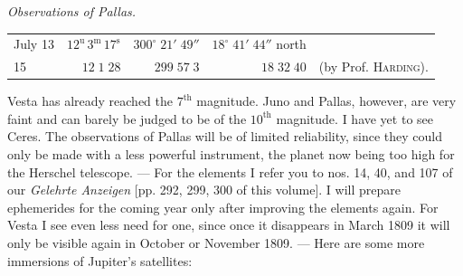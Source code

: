 \begin{center}\emph{Observations of Pallas.}\end{center}

\begin{center}\fontsize{9}{12}\selectfont\setlength{\tabcolsep}{3pt}\renewcommand{\arraystretch}{1.15}\begin{tabular}{lrrrl}
July 13 & $12^{\text{u}}\,3^{\text{m}}\,17^{\text{s}}$ & $300^\circ\;21'\;49''$ & $18^\circ\;41'\;44''$ north & \\
15 & $12\;1\;28$ & $299\;57\;3$ & $18\;32\;40$ & (by Prof. \textsc{Harding}).\\
\end{tabular}\end{center}

\par\indent Vesta has already reached the $7^{\text{th}}$ magnitude. Juno and Pallas, however, are very faint and can barely be judged to be of the $10^{\text{th}}$ magnitude. I have yet to see Ceres. The observations of Pallas will be of limited reliability, since they could only be made with a less powerful instrument, the planet now being too high for the Herschel telescope. --- For the elements I refer you to nos. 14, 40, and 107 of our \emph{Gelehrte Anzeigen} [pp. 292, 299, 300 of this volume]. I will prepare ephemerides for the coming year only after improving the elements again. For Vesta I see even less need for one, since once it disappears in March 1809 it will only be visible again in October or November 1809. --- Here are some more immersions of Jupiter’s satellites:

